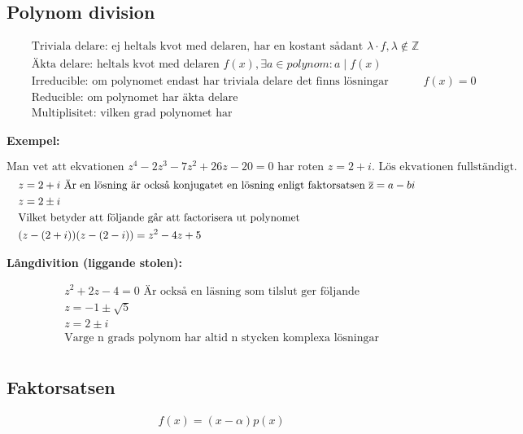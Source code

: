 \documentclass{article}
\begin{document}
\subsection{Polynom division}
\begin{align*}
  &\quad  \text{Triviala delare: ej heltals kvot med delaren, har en kostant sådant } \lambda \cdot f, \lambda \notin \mathbb{Z}  \\
  &\quad  \text{Äkta delare: heltals kvot med delaren } f(x), \exists a \in polynom: a \mid f(x) \\
  &\quad  \text{Irreducible: om polynomet endast har triviala delare det finns lösningar heltaslösningar } f(x)=0 \\
  &\quad  \text{Reducible: om polynomet har äkta delare} \\
  &\quad  \text{Multiplisitet: vilken grad polynomet har}
\end{align*}


\textbf{Exempel:}\par
\begin{equation}
   \text{Man vet att ekvationen } z^4 - 2z^3 - 7z^2 + 26z - 20 = 0 \text{ har roten } z = 2 + i \text{. Lös ekvationen fullständigt.}
\end{equation}
\begin{align*}
  &\quad z = 2 + i \text{ Är en lösning är också konjugatet en lösning enligt faktorsatsen } \overline{\rm z}= a - b i \\
  &\quad z = 2 \pm i \\
  &\quad \text{Vilket betyder att följande går att factorisera ut polynomet} \\
  &\quad (z -(2 + i))(z -(2 - i)) = z^2 - 4z + 5 \\
\end{align*}

\textbf{Långdivition (liggande stolen):}\par
{}
\begin{align*}
  &\quad z^2 + 2z - 4 = 0 \text{ Är också en läsning som tilslut ger följande} \\
  &\quad z = -1 \pm \sqrt{5} \\
  &\quad z = 2 \pm i \\
  &\quad \text{Varge n grads polynom har altid n stycken komplexa lösningar} \\
\end{align*}

\newpage

\subsection{Faktorsatsen}
\begin{align*} 
  &\quad  f(x) = (x - \alpha)p(x) \\
\end{align*}
\end{document}
